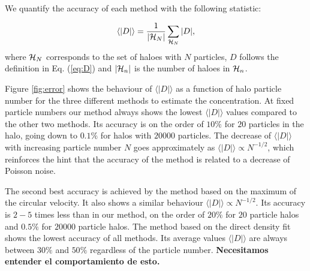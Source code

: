 \documentclass[useAMS,usenatbib]{mn2e}
\newcommand{\avg}[1]{\langle{#1}\rangle}
\begin{document}
We quantify the accuracy of each method with the following statistic:

\begin{equation}
\avg{|D|}=\frac{1}{\left|{\cal{H}}_N\right|}\sum_{{\cal{H}}_N} |D|,
\end{equation}
%
where ${\cal{H}}_N$ corresponds to the set of haloes with $N$
particles, $D$ follows the definition in Eq. (\ref{eq:D}) and
$\left|{\cal{H}}_n\right|$ is the number of haloes in ${\cal{H}}_n$.


Figure \ref{fig:error} shows the behaviour of $\avg{|D|}$ as a function of
halo particle number for the three different methods to estimate the
concentration.
At fixed particle numbers our method always shows the lowest
$\avg{|D|}$ values compared to the other two methods.
Its accuracy is on the order of $10\%$ for $20$ particles in the halo,
going down to $0.1\%$ for halos with $20000$ particles.
The decrease of $\avg{|D|}$ with increasing particle number $N$ goes
approximately as $\avg{|D|}\propto N^{-1/2}$, which reinforces the hint that
the accuracy of the method is related to a decrease of Poisson
noise.

The second best accuracy is achieved by the method based on the
maximum of the circular velocity.
It also shows a similar behaviour $\avg{|D|}\propto N^{-1/2}$.
Its accuracy is $2-5$ times less than in our method, on the order of
$20\%$ for $20$ particle halos and $0.5\%$ for $20000$ particle halos.
The method based on the direct density fit shows the lowest accuracy
of all methods.
Its average values $\avg{|D|}$ are always between $30\%$ and $50\%$
regardless of the particle number. {\bf Necesitamos entender el
  comportamiento de esto.}
\end{document}
